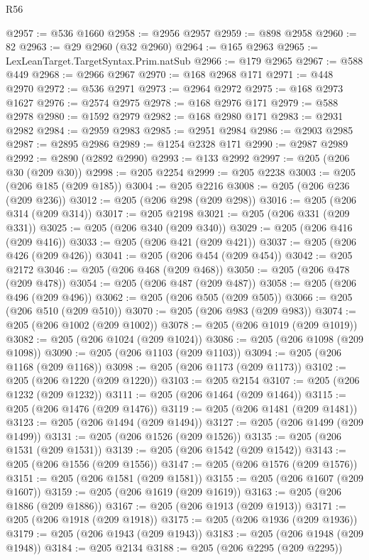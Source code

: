 \begin{lexlean}{R56}
\begin{coremodule}
@2957 := @536 @1660
@2958 := @2956 @2957
@2959 := @898 @2958
@2960 := 82
@2963 := @29 @2960 (@32 @2960)
@2964 := @165 @2963
@2965 := LexLeanTarget.TargetSyntax.Prim.natSub
@2966 := @179 @2965
@2967 := @588 @449
@2968 := @2966 @2967
@2970 := @168 @2968 @171
@2971 := @448 @2970
@2972 := @536 @2971
@2973 := @2964 @2972
@2975 := @168 @2973 @1627
@2976 := @2574 @2975
@2978 := @168 @2976 @171
@2979 := @588 @2978
@2980 := @1592 @2979
@2982 := @168 @2980 @171
@2983 := @2931 @2982
@2984 := @2959 @2983
@2985 := @2951 @2984
@2986 := @2903 @2985
@2987 := @2895 @2986
@2989 := @1254 @2328 @171
@2990 := @2987 @2989
@2992 := @2890 (@2892 @2990)
@2993 := @133 @2992
@2997 := @205 (@206 @30 (@209 @30))
@2998 := @205 @2254
@2999 := @205 @2238
@3003 := @205 (@206 @185 (@209 @185))
@3004 := @205 @2216
@3008 := @205 (@206 @236 (@209 @236))
@3012 := @205 (@206 @298 (@209 @298))
@3016 := @205 (@206 @314 (@209 @314))
@3017 := @205 @2198
@3021 := @205 (@206 @331 (@209 @331))
@3025 := @205 (@206 @340 (@209 @340))
@3029 := @205 (@206 @416 (@209 @416))
@3033 := @205 (@206 @421 (@209 @421))
@3037 := @205 (@206 @426 (@209 @426))
@3041 := @205 (@206 @454 (@209 @454))
@3042 := @205 @2172
@3046 := @205 (@206 @468 (@209 @468))
@3050 := @205 (@206 @478 (@209 @478))
@3054 := @205 (@206 @487 (@209 @487))
@3058 := @205 (@206 @496 (@209 @496))
@3062 := @205 (@206 @505 (@209 @505))
@3066 := @205 (@206 @510 (@209 @510))
@3070 := @205 (@206 @983 (@209 @983))
@3074 := @205 (@206 @1002 (@209 @1002))
@3078 := @205 (@206 @1019 (@209 @1019))
@3082 := @205 (@206 @1024 (@209 @1024))
@3086 := @205 (@206 @1098 (@209 @1098))
@3090 := @205 (@206 @1103 (@209 @1103))
@3094 := @205 (@206 @1168 (@209 @1168))
@3098 := @205 (@206 @1173 (@209 @1173))
@3102 := @205 (@206 @1220 (@209 @1220))
@3103 := @205 @2154
@3107 := @205 (@206 @1232 (@209 @1232))
@3111 := @205 (@206 @1464 (@209 @1464))
@3115 := @205 (@206 @1476 (@209 @1476))
@3119 := @205 (@206 @1481 (@209 @1481))
@3123 := @205 (@206 @1494 (@209 @1494))
@3127 := @205 (@206 @1499 (@209 @1499))
@3131 := @205 (@206 @1526 (@209 @1526))
@3135 := @205 (@206 @1531 (@209 @1531))
@3139 := @205 (@206 @1542 (@209 @1542))
@3143 := @205 (@206 @1556 (@209 @1556))
@3147 := @205 (@206 @1576 (@209 @1576))
@3151 := @205 (@206 @1581 (@209 @1581))
@3155 := @205 (@206 @1607 (@209 @1607))
@3159 := @205 (@206 @1619 (@209 @1619))
@3163 := @205 (@206 @1886 (@209 @1886))
@3167 := @205 (@206 @1913 (@209 @1913))
@3171 := @205 (@206 @1918 (@209 @1918))
@3175 := @205 (@206 @1936 (@209 @1936))
@3179 := @205 (@206 @1943 (@209 @1943))
@3183 := @205 (@206 @1948 (@209 @1948))
@3184 := @205 @2134
@3188 := @205 (@206 @2295 (@209 @2295))

\end{coremodule}
\end{lexlean}
